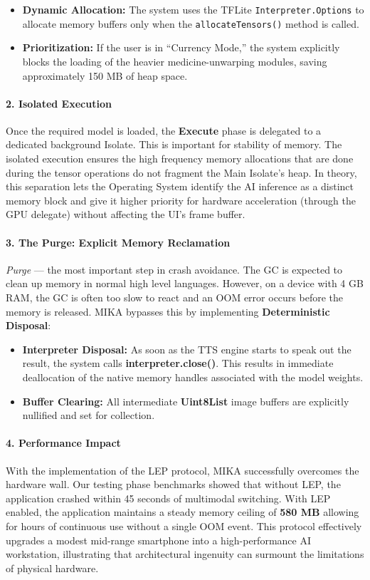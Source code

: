 \documentclass[12pt,a4paper]{report}
\begin{document}
\begin{itemize}
    \item \textbf{Dynamic Allocation:} The system uses the TFLite \texttt{Interpreter.Options} to allocate memory buffers only when the \texttt{allocateTensors()} method is called.
    \item \textbf{Prioritization:} If the user is in ``Currency Mode,'' the system explicitly blocks the loading of the heavier medicine-unwarping modules, saving approximately 150 MB of heap space.
\end{itemize}
 
\paragraph{2. Isolated Execution}
Once the required model is loaded, the \textbf{Execute} phase is delegated to a dedicated background Isolate. This is important for stability of memory. The isolated execution ensures the high frequency memory allocations that are done during the tensor operations do not fragment the Main Isolate's heap. In theory, this separation lets the Operating System identify the AI inference as a distinct memory block and give it higher priority for hardware acceleration (through the GPU delegate) without affecting the UI’s frame buffer.
\paragraph{3. The Purge: Explicit Memory Reclamation}
 \textit{Purge} — the most important step in crash avoidance. The GC is expected to clean up memory in normal high level languages. However, on a device with 4 GB RAM, the GC is often too slow to react and an OOM error occurs before the memory is released.
MIKA bypasses this by implementing \textbf{Deterministic Disposal}:
\begin{itemize}
    \item \textbf{Interpreter Disposal:} As soon as the TTS engine starts to speak out the result, the system calls \textbf{interpreter.close()}. This results in immediate deallocation of the native memory handles associated with the model weights.
    \item \textbf{Buffer Clearing:} All intermediate \textbf{Uint8List} image buffers are explicitly nullified and set for collection. 
\end{itemize}
 
\paragraph{4. Performance Impact}
With the implementation of the LEP protocol, MIKA successfully overcomes the hardware wall. Our testing phase benchmarks showed that without LEP, the application crashed within 45 seconds of multimodal switching. With LEP enabled, the application maintains a steady memory ceiling of \textbf{580 MB} allowing for hours of continuous use without a single OOM event. This protocol effectively upgrades a modest mid-range smartphone into a high-performance AI workstation, illustrating that architectural ingenuity can surmount the limitations of physical hardware.
\end{document}
